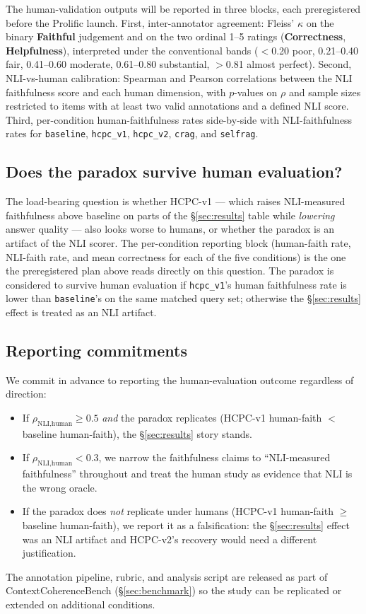 The human-validation outputs will be reported in three blocks, each
preregistered before the Prolific launch. First, inter-annotator
agreement: Fleiss' $\kappa$ on the binary \textbf{Faithful} judgement
and on the two ordinal 1--5 ratings (\textbf{Correctness},
\textbf{Helpfulness}), interpreted under the conventional bands
($<$0.20 poor, 0.21--0.40 fair, 0.41--0.60 moderate, 0.61--0.80
substantial, $>$0.81 almost perfect). Second, NLI-vs-human calibration:
Spearman and Pearson correlations between the NLI faithfulness score
and each human dimension, with $p$-values on $\rho$ and sample sizes
restricted to items with at least two valid annotations and a defined
NLI score. Third, per-condition human-faithfulness rates side-by-side
with NLI-faithfulness rates for \texttt{baseline}, \texttt{hcpc\_v1},
\texttt{hcpc\_v2}, \texttt{crag}, and \texttt{selfrag}.

\subsection{Does the paradox survive human evaluation?}

The load-bearing question is whether HCPC-v1 — which raises NLI-measured
faithfulness above baseline on parts of the §\ref{sec:results} table
while \emph{lowering} answer quality — also looks worse to humans, or
whether the paradox is an artifact of the NLI scorer. The
per-condition reporting block (human-faith rate, NLI-faith rate, and
mean correctness for each of the five conditions) is the one the
preregistered plan above reads directly on this question. The paradox
is considered to survive human evaluation if \texttt{hcpc\_v1}'s human
faithfulness rate is lower than \texttt{baseline}'s on the same matched
query set; otherwise the §\ref{sec:results} effect is treated as an NLI
artifact.

\subsection{Reporting commitments}

We commit in advance to reporting the human-evaluation outcome regardless
of direction:

\begin{itemize}
  \item If $\rho_{\text{NLI},\text{human}} \geq 0.5$ \emph{and} the
        paradox replicates (HCPC-v1 human-faith $<$ baseline human-faith),
        the §\ref{sec:results} story stands.
  \item If $\rho_{\text{NLI},\text{human}} < 0.3$, we narrow the
        faithfulness claims to ``NLI-measured faithfulness'' throughout
        and treat the human study as evidence that NLI is the wrong
        oracle.
  \item If the paradox does \emph{not} replicate under humans (HCPC-v1
        human-faith $\geq$ baseline human-faith), we report it as a
        falsification: the §\ref{sec:results} effect was an NLI
        artifact and HCPC-v2's recovery would need a different
        justification.
\end{itemize}

The annotation pipeline, rubric, and analysis script are released as
part of ContextCoherenceBench (§\ref{sec:benchmark}) so the study can be
replicated or extended on additional conditions.

